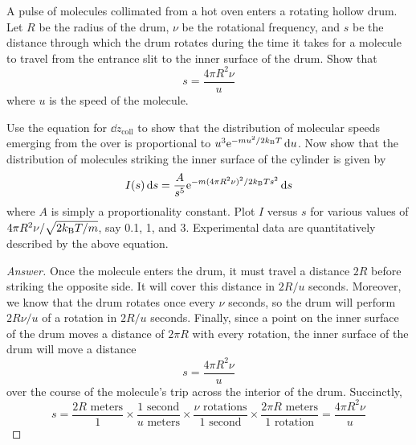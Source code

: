 \documentclass[../psets.tex]{subfiles}
\begin{document}
\begin{enumerate}[label={\textbf{27-\arabic*.}},leftmargin=3.5em]
\begin{figure}[H]
\begin{subfigure}[b]{0.3\linewidth}
            \caption{}
        \end{subfigure}
    \end{figure}
    A pulse of molecules collimated from a hot oven enters a rotating hollow drum. Let $R$ be the radius of the drum, $\nu$ be the rotational frequency, and $s$ be the distance through which the drum rotates during the time it takes for a molecule to travel from the entrance slit to the inner surface of the drum. Show that
    \begin{equation*}
        s = \frac{4\pi R^2\nu}{u}
    \end{equation*}
    where $u$ is the speed of the molecule.\par
    Use the equation for $\dd{z_\text{coll}}$ to show that the distribution of molecular speeds emerging from the over is proportional to $u^3\e[-mu^2/2\kB T]\dd{u}$. Now show that the distribution of molecules striking the inner surface of the cylinder is given by
    \begin{equation*}
        I(s)\dd{s} = \frac{A}{s^5}\e[-m(4\pi R^2\nu)^2/2\kB Ts^2]\dd{s}
    \end{equation*}
    where $A$ is simply a proportionality constant. Plot $I$ versus $s$ for various values of $4\pi R^2\nu/\sqrt{2\kB T/m}$, say 0.1, 1, and 3. Experimental data are quantitatively described by the above equation.
    \begin{proof}[Answer]
        Once the molecule enters the drum, it must travel a distance $2R$ before striking the opposite side. It will cover this distance in $2R/u$ seconds. Moreover, we know that the drum rotates once every $\nu$ seconds, so the drum will perform $2R\nu/u$ of a rotation in $2R/u$ seconds. Finally, since a point on the inner surface of the drum moves a distance of $2\pi R$ with every rotation, the inner surface of the drum will move a distance
        \begin{equation*}
            s = \frac{4\pi R^2\nu}{u}
        \end{equation*}
        over the course of the molecule's trip across the interior of the drum. Succinctly,
        \begin{equation*}
            s = \frac{2R\text{ meters}}{1}\times\frac{1\text{ second}}{u\text{ meters}}\times\frac{\nu\text{ rotations}}{1\text{ second}}\times\frac{2\pi R\text{ meters}}{1\text{ rotation}}
            = \frac{4\pi R^2\nu}{u}

\end{equation*}
\end{proof}
\end{enumerate}
\end{document}
